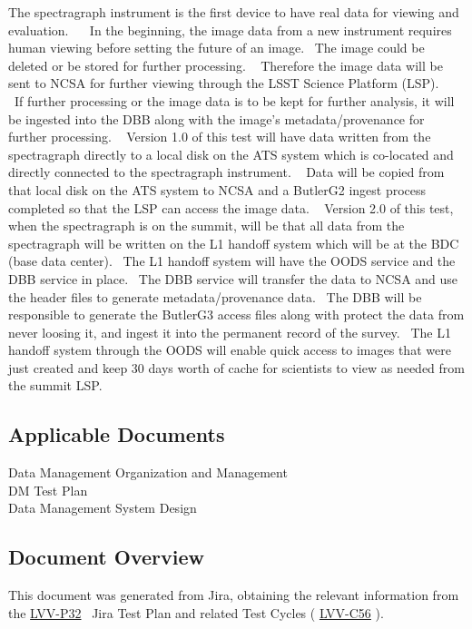 \documentclass[DM,lsstdraft,STR,toc]{lsstdoc}
\begin{document}
The spectragraph instrument is the first device to have real data for
viewing and evaluation. ~ ~In the beginning, the image data from a new
instrument requires human viewing before setting the future of an image.
~The image could be deleted or be stored for further processing. ~
Therefore the image data will be sent to NCSA for further viewing
through the LSST Science Platform (LSP). ~ ~If further processing or the
image data is to be kept for further analysis, it will be ingested into
the DBB along with the image's metadata/provenance for further
processing. ~ Version 1.0 of this test will have data written from the
spectragraph directly to a local disk on the ATS system which is
co-located and directly connected to the spectragraph instrument. ~ Data
will be copied from that local disk on the ATS system to NCSA and a
ButlerG2 ingest process completed so that the LSP can access the image
data. ~ Version 2.0 of this test, when the spectragraph is on the
summit, will be that all data from the spectragraph will be written on
the L1 handoff system which will be at the BDC (base data center). ~The
L1 handoff system will have the OODS service and the DBB service in
place. ~The DBB service will transfer the data to NCSA and use the
header files to generate metadata/provenance data. ~The DBB will be
responsible to generate the ButlerG3 access files along with protect the
data from never loosing it, and ingest it into the permanent record of
the survey. ~The L1 handoff system through the OODS will enable quick
access to images that were just created and keep 30 days worth of cache
for scientists to view as needed from the summit LSP.
~\\[2\baselineskip]

\subsection{Applicable Documents}\label{applicable-documents}

 Data Management Organization and Management\\
 DM Test Plan\\
 Data Management System Design


\subsection{Document Overview}
\label{sect:docoverview}

This document was generated from Jira, obtaining the relevant information from the 
\href{https://jira.lsstcorp.org/secure/Tests.jspa#/testPlan/LVV-P32}{LVV-P32}
~Jira Test Plan and related Test Cycles (
  \href{https://jira.lsstcorp.org/secure/Tests.jspa#/testCycle/LVV-C56}{LVV-C56}
).
\end{document}
